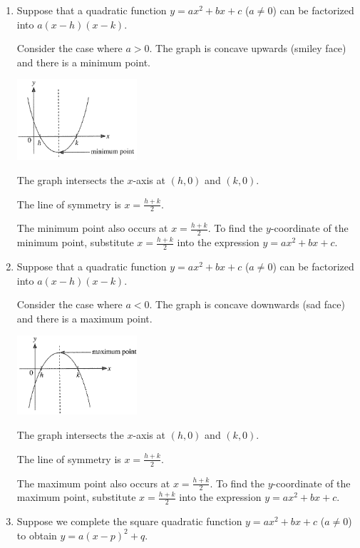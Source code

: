 \documentclass[twocolumn]{article}
\begin{document}
\begin{enumerate}

\item Suppose that a quadratic function $y=ax^2+bx+c$ ($a \neq 0$) can be factorized into $a(x-h)(x-k)$.

Consider the case where $a > 0$. The graph is concave upwards (smiley face) and there is a minimum point.

\includegraphics[width=0.35\textwidth]{05.png}

The graph intersects the $x$-axis at $(h,0)$ and $(k,0)$. 

The line of symmetry is $x = \frac{h+k}{2}$.

The minimum point also occurs at $x = \frac{h+k}{2}$. To find the $y$-coordinate of the minimum point, substitute $x = \frac{h+k}{2}$ into the expression $y=ax^2+bx+c$.

\item  Suppose that a quadratic function $y=ax^2+bx+c$ ($a \neq 0$) can be factorized into $a(x-h)(x-k)$.

Consider the case where $a < 0$. The graph is concave downwards (sad face) and there is a maximum point.

\includegraphics[width=0.35\textwidth]{06.png}

The graph intersects the $x$-axis at $(h,0)$ and $(k,0)$. 

The line of symmetry is $x = \frac{h+k}{2}$.

The maximum point also occurs at $x = \frac{h+k}{2}$. To find the $y$-coordinate of the maximum point, substitute $x = \frac{h+k}{2}$ into the expression $y=ax^2+bx+c$.

\item Suppose we complete the square quadratic function $y=ax^2+bx+c$ ($a \neq 0$) to obtain $y = a(x-p)^2 + q$.


\end{enumerate}
\end{document}
